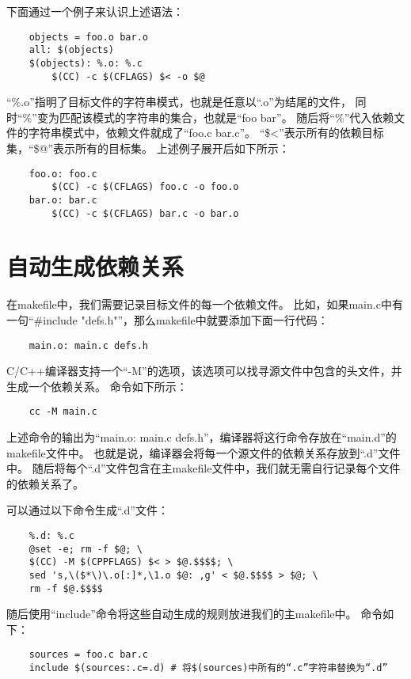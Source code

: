 \documentclass[a4paper,left=2.5cm,right=2.5cm,11pt]{article}
\begin{document}
	下面通过一个例子来认识上述语法：
	\begin{lstlisting}
	objects = foo.o bar.o
	all: $(objects)
	$(objects): %.o: %.c
		$(CC) -c $(CFLAGS) $< -o $@
	\end{lstlisting}

	“\%.o”指明了目标文件的字符串模式，也就是任意以“.o”为结尾的文件，
	同时“\%”变为匹配该模式的字符串的集合，也就是“foo bar”。
	随后将“\%”代入依赖文件的字符串模式中，依赖文件就成了“foo.c bar.c”。
	“\$<”表示所有的依赖目标集，“\$@”表示所有的目标集。
	上述例子展开后如下所示：
	\begin{lstlisting}
	foo.o: foo.c
		$(CC) -c $(CFLAGS) foo.c -o foo.o
	bar.o: bar.c
		$(CC) -c $(CFLAGS) bar.c -o bar.o
	\end{lstlisting}

\section{自动生成依赖关系}
	在makefile中，我们需要记录目标文件的每一个依赖文件。
	比如，如果main.c中有一句“\#include "defs.h"”，那么makefile中就要添加下面一行代码：
	\begin{lstlisting}
	main.o: main.c defs.h
	\end{lstlisting}

	C/C++编译器支持一个“-M”的选项，该选项可以找寻源文件中包含的头文件，并生成一个依赖关系。
	命令如下所示：
	\begin{lstlisting}
	cc -M main.c
	\end{lstlisting}

	上述命令的输出为“main.o: main.c defs.h”，编译器将这行命令存放在“main.d”的makefile文件中。
	也就是说，编译器会将每一个源文件的依赖关系存放到“.d”文件中。
	随后将每个“.d”文件包含在主makefile文件中，我们就无需自行记录每个文件的依赖关系了。\par

	可以通过以下命令生成“.d”文件：
	\begin{lstlisting}
	%.d: %.c
	@set -e; rm -f $@; \
	$(CC) -M $(CPPFLAGS) $< > $@.$$$$; \
	sed 's,\($*\)\.o[:]*,\1.o $@: ,g' < $@.$$$$ > $@; \
	rm -f $@.$$$$
	\end{lstlisting}

	随后使用“include”命令将这些自动生成的规则放进我们的主makefile中。
	命令如下：
	\begin{lstlisting}
	sources = foo.c bar.c
	include $(sources:.c=.d) # 将$(sources)中所有的“.c”字符串替换为“.d”
	\end{lstlisting}
\end{document}
